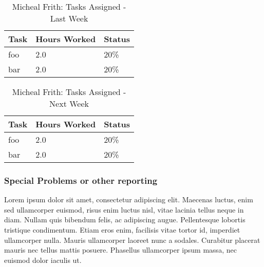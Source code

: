 \documentclass[12pt,journal,compsoc]{IEEEtran}
\begin{document}
\begin{table}[ht]
\renewcommand{\arraystretch}{1.3}
	\caption{Micheal Frith: Tasks Assigned - Last Week}
	
	\label{Summary of Micheal Frith's activities: this week}
	
	\centering
	
	\begin{tabular}{p{5.5cm}|p{1cm}|p{1cm}}

	\hline
	\bfseries 	Task		 		& \bfseries Hours Worked	& \bfseries Status	\\
	\hline
	\hline
				foo					& 2.0						& 20\%				\\	%
				bar					& 2.0						& 20\%				\\	
	\hline
	\end{tabular}
\end{table}

\begin{table}[ht]
\renewcommand{\arraystretch}{1.3}
	\caption{Micheal Frith: Tasks Assigned - Next Week}
	
	\label{Summary of Micheal Frith's activities: this week}
	
	\centering
	
	\begin{tabular}{p{5.5cm}|p{1cm}|p{1cm}}

	\hline
	\bfseries 	Task		 		& \bfseries Hours Worked	& \bfseries Status	\\
	\hline
	\hline
				foo					& 2.0						& 20\%				\\	%
				bar					& 2.0						& 20\%				\\	
	\hline
	\end{tabular}
\end{table}

\subsubsection*{Special Problems or other reporting}
Lorem ipsum dolor sit amet, consectetur adipiscing elit. Maecenas luctus, enim sed ullamcorper euismod, risus enim luctus nisl, vitae lacinia tellus neque in diam. Nullam quis bibendum felis, ac adipiscing augue. Pellentesque lobortis tristique condimentum. Etiam eros enim, facilisis vitae tortor id, imperdiet ullamcorper nulla. Mauris ullamcorper laoreet nunc a sodales. Curabitur placerat mauris nec tellus mattis posuere. Phasellus ullamcorper ipsum massa, nec euismod dolor iaculis ut.
\end{document}
